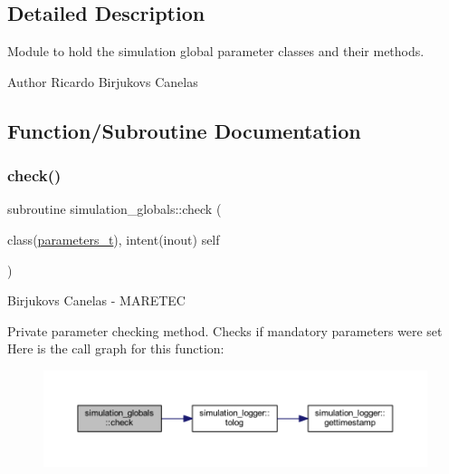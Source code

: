 \subsection{Detailed Description}
Module to hold the simulation global parameter classes and their methods. 

\begin{DoxyAuthor}{Author}
Ricardo Birjukovs Canelas 
\end{DoxyAuthor}


\subsection{Function/\+Subroutine Documentation}
\mbox{\label{namespacesimulation__globals_a3867df0f77dca3700c9470aea24fd048}} 
\subsubsection{\texorpdfstring{check()}{check()}}
{\footnotesize\ttfamily subroutine simulation\+\_\+globals\+::check (\begin{DoxyParamCaption}\item[{class(\hyperlink{structsimulation__globals_1_1parameters__t}{parameters\+\_\+t}), intent(inout)}]{self }\end{DoxyParamCaption})\hspace{0.3cm}{\ttfamily [private]}}



Birjukovs Canelas -\/ M\+A\+R\+E\+T\+EC 

Private parameter checking method. Checks if mandatory parameters were set Here is the call graph for this function\+:\nopagebreak
\begin{figure}[H]
\begin{center}
\leavevmode
\includegraphics[width=350pt]{namespacesimulation__globals_a3867df0f77dca3700c9470aea24fd048_cgraph}
\end{center}
\end{figure}
\mbox{\label{namespacesimulation__globals_a2c6bf88542c503d1da58280ab3dcf772}} 
